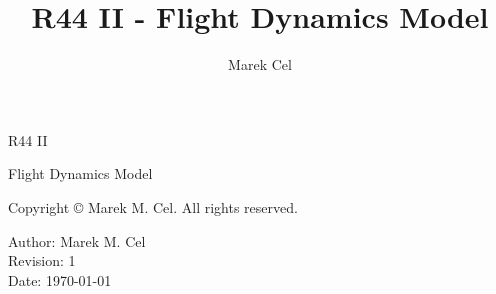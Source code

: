 \documentclass[12pt,a4paper]{article}
\title{R44 II - Flight Dynamics Model}
\author{Marek Cel}
\date{}
\begin{document}
  
  \begin{titlepage}
    \centering
    {\huge R44 II \par Flight Dynamics Model\par}
  \end{titlepage}
  

  \noindent Copyright \copyright{} \the\year{} Marek M. Cel. All rights reserved.

  \noindent Author: Marek M. Cel \\
  Revision: 1 \\
  Date: \today

  
  \clearpage
  \thispagestyle{empty}
  

  \restoregeometry

  {
    \clearpage
    \setlength{\parskip}{0em}
    \tableofcontents
  }

  
  
  
  \clearpage
   
  
  
\end{document}
